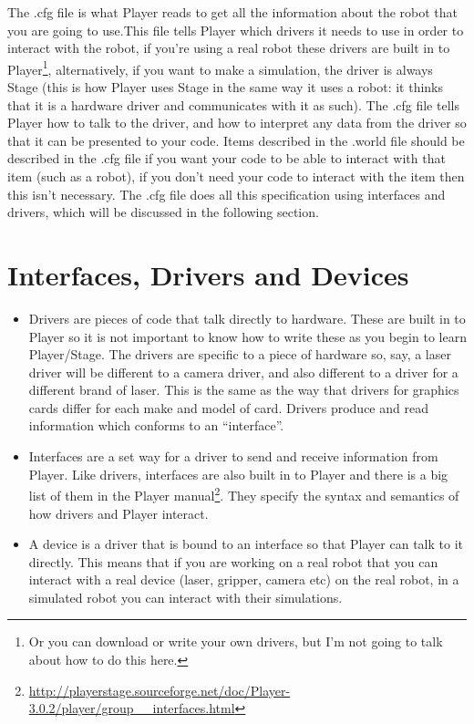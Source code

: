 \documentclass[a4paper]{report}
\newcommand{\plst}{Player/Stage\xspace}
\newcommand{\pl}{Player\xspace}
\begin{document}
The .cfg file is what \pl reads to get all the information about the robot that you are going to use.This file tells \pl which drivers it needs to use in order to interact with the robot, if you're using a real robot these drivers are built in to \pl\footnote{Or you can download or write your own drivers, but I'm not going to talk about how to do this here.}, alternatively, if you want to make a simulation, the driver is always Stage (this is how \pl uses Stage in the same way it uses a robot: it thinks that it is a hardware driver and communicates with it as such). The .cfg file tells \pl how to talk to the driver, and how to interpret any data from the driver so that it can be presented to your code. Items described in the .world file should be described in the .cfg file if you want your code to be able to interact with that item (such as a robot), if you don't need your code to interact with the item then this isn't necessary. The .cfg file does all this specification using interfaces and drivers, which will be discussed in the following section.

\section{Interfaces, Drivers and Devices} \label{sec:Basics:InterfaceDriverDevices}
\begin{itemize}
\item Drivers are pieces of code that talk directly to hardware. These are built in to \pl so it is not important to know how to write these as you begin to learn \plst. The drivers are specific to a piece of hardware so, say, a laser driver will be different to a camera driver, and also different to a driver for a different brand of laser. This is the same as the way that drivers for graphics cards differ for each make and model of card. Drivers produce and read information which conforms to an ``interface''.

\item Interfaces are a set way for a driver to send and receive information from \pl. Like drivers, interfaces are also built in to \pl and there is a big list of them in the \pl manual\footnote{\url{http://playerstage.sourceforge.net/doc/Player-3.0.2/player/group__interfaces.html}}. They specify the syntax and semantics of how drivers and \pl interact.
	
\item A device is a driver that is bound to an interface so that \pl can talk to it directly. This means that if you are working on a real robot that you can interact with a real device (laser, gripper, camera etc) on the real robot, in a simulated robot you can interact with their simulations. 
\end{itemize}
\end{document}
